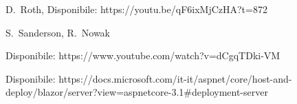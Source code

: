 \begin{thebibliography}{999}
D.~Roth,
Disponibile: https://youtu.be/qF6ixMjCzHA?t=872

S.~Sanderson, R.~Nowak

Disponibile: https://www.youtube.com/watch?v=dCgqTDki-VM

Disponibile: https://docs.microsoft.com/it-it/aspnet/core/host-and-deploy/blazor/server?view=aspnetcore-3.1\#deployment-server


%
%
%
%
%
%
%



\end{thebibliography}
